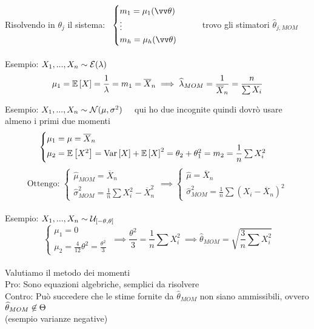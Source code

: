 Risolvendo in $\theta_j$ il sistema: \ $ \begin{cases}
    m_1=\mu_1(\vt)\\
    \vdots \\
    m_h=\mu_h(\vt)
\end{cases}$ \ \ \ trovo gli stimatori $\hat{\theta}_{j, MOM}$ \\ \\


Esempio: $X_1,...,X_n \sim \mathcal E(\lambda)$\\
\[\mu_1=\mathbb{E} \left[ X \right]=\dfrac{1}{\lambda}=m_1=\overline{X}_n \implies\widehat{\lambda}_{MOM}=\dfrac{1}{\overline{X}_n}=\dfrac{n}{\sum X_i}\]

Esempio: $X_1,...,X_n \sim \mathcal N(\mu,\sigma^2)$ \ \ qui ho due incognite quindi dovrò usare almeno i primi due momenti\\
\[\begin{cases}
    \mu_1=\mu=\overline{X}_n\\
    \mu_2=\mathbb{E} \left[ X^2 \right]=\text{Var} \left[ X \right]+\mathbb{E} \left[ X \right]^2 = \theta_2+\theta_1^2 = m_2 = \dfrac{1}{n}\sum X_i^2
\end{cases}\]
\[ \text{Ottengo: \ }\begin{cases}
\hat{\mu}_{MOM}=\overline{X}_n\\
\hat{\sigma}^2_{MOM}=\frac{1}{n}\sum X^2_i -\overline{X}_n^2
\end{cases} \implies \begin{cases}
    \hat{\mu}=\overline{X}_n\\
    \hat{\sigma}^2_{MOM}=\frac{1}{n}\sum(X_i-\overline{X}_n)^2
\end{cases}\] \\

Esempio: $X_1,...,X_n \sim \mathcal U_{[-\theta,\theta]}$
\[\begin{cases}
    \mu_1=0\\
    \mu_2=\frac{4}{12}\theta^2=\frac{\theta^2}{3}
\end{cases} \ \implies \frac{\theta^2}{3}=\frac{1}{n}\sum X_i^2 \ \implies \hat{\theta}_{MOM}=\sqrt{\frac{3}{n}\sum X_i^2}\] \\

Valutiamo il metodo dei momenti\\
Pro: Sono equazioni algebriche, semplici da risolvere \\
Contro: Può succedere che le stime fornite da $\hat{\theta}_{MOM}$ non siano ammissibili, ovvero $\Hat{\theta}_{MOM}\not\in\Theta$\\ (esempio varianze negative)\\

